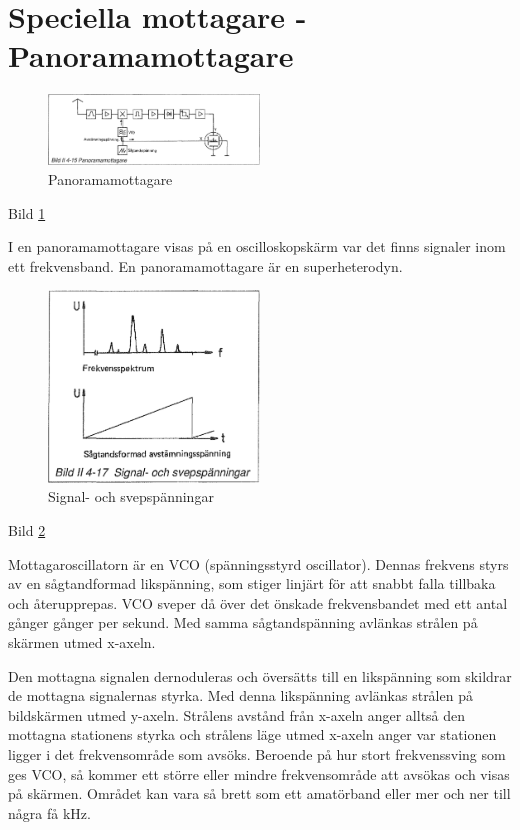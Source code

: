 \section{Speciella mottagare - Panoramamottagare}

\begin{figure}
  \includegraphics[width=0.5\textwidth]{images/bild_2_4-15}
  \caption{Panoramamottagare}
  \label{fig:bildII4-15}
\end{figure}

Bild \ref{fig:bildII4-15}

I en panoramamottagare visas på en oscilloskopskärm var det finns
signaler inom ett frekvensband. En panoramamottagare är en
superheterodyn.

\begin{figure}
  \includegraphics[width=0.5\textwidth]{images/bild_2_4-17}
  \caption{Signal- och svepspänningar}
  \label{fig:bildII4-17}
\end{figure}

Bild \ref{fig:bildII4-17}

Mottagaroscillatorn är en VCO (spänningsstyrd oscillator). Dennas
frekvens styrs av en sågtandformad likspänning, som stiger linjärt för
att snabbt falla tillbaka och återupprepas. VCO sveper då över det
önskade frekvensbandet med ett antal gånger gånger per sekund. Med
samma sågtandspänning avlänkas strålen på skärmen utmed x-axeln.

Den mottagna signalen dernoduleras och översätts till en likspänning
som skildrar de mottagna signalernas styrka. Med denna likspänning
avlänkas strålen på bildskärmen utmed y-axeln. Strålens avstånd från
x-axeln anger alltså den mottagna stationens styrka och strålens läge
utmed x-axeln anger var stationen ligger i det frekvensområde som
avsöks. Beroende på hur stort frekvenssving som ges VCO, så kommer ett
större eller mindre frekvensområde att avsökas och visas på
skärmen. Området kan vara så brett som ett amatörband eller mer och
ner till några få kHz.

